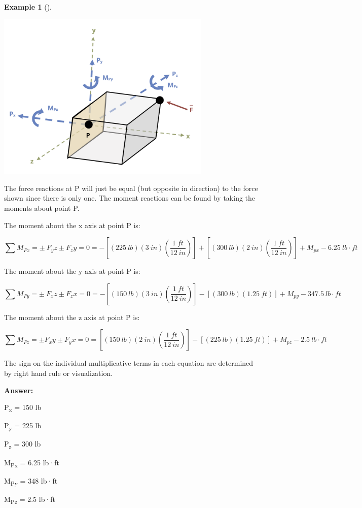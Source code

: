 \documentclass[
  letterpaper,
  DIV=11,
  numbers=noendperiod]{scrreprt}
\theoremstyle{definition}
\newtheorem{example}{Example}[chapter]
\theoremstyle{remark}
\begin{document}
\begin{tcolorbox}
\begin{example}[]
\begin{tcolorbox}
\begin{center}
\includegraphics[width=4.04167in,height=\textheight]{images/CH1 PNGs/example 1.6 part 2.png}
\end{center}

The force reactions at P will just be equal (but opposite in direction)
to the force shown since there is only one. The moment reactions can be
found by taking the moments about point P.

The moment about the x axis at point P is:

\[
\sum M_{Px} = \pm ~F_yz \pm F_zy = 0 = -[(225{~lb})(3{~in})(\frac{1{~ft}}{12{~in}})]+[(300{~lb})(2{~in})(\frac{1{~ft}}{12{~in}})]+M_{px} -6.25{~lb·ft}
\]

The moment about the y axis at point P is:

\[
\sum M_{Py} = \pm ~F_xz \pm F_zx = 0 = -[(150{~lb})(3{~in})(\frac{1{~ft}}{12{~in}})]-[(300{~lb})(1.25{~ft})]+M_{py} -347.5{~lb·ft}
\]

The moment about the z axis at point P is:

\[
\sum M_{Pz} = \pm F_xy \pm F_yx = 0 = [(150{~lb})(2{~in})(\frac{1{~ft}}{12{~in}})]-[(225{~lb})(1.25{~ft})]+M_{pz} -2.5{~lb·ft}
\]

The sign on the individual multiplicative terms in each equation are
determined by right hand rule or visualization.

\textbf{Answer:}

P\textsubscript{x} = 150 lb

P\textsubscript{y} = 225 lb

P\textsubscript{z} = 300 lb

M\textsubscript{Px} = 6.25 lb·ft

M\textsubscript{Py} = 348 lb·ft

M\textsubscript{Pz} = 2.5 lb·ft

\end{tcolorbox}

\end{example}

\end{tcolorbox}
\end{document}
